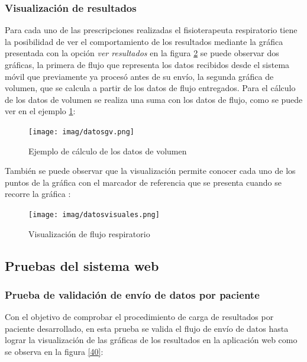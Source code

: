 \documentclass[12pt]{article}
\begin{document}
\subsubsection{Visualización de resultados}

Para cada uno de las prescripciones realizadas el fisioterapeuta respiratorio tiene la posibilidad de ver el comportamiento de los resultados mediante la gráfica presentada con la opción \textit{ver resultados} en la figura \ref{39} se puede observar dos gráficas, la primera de flujo que representa los datos recibidos desde el sistema móvil que previamente ya procesó antes de su envío, la segunda gráfica de volumen, que se calcula a partir de los datos de flujo entregados. Para el cálculo de los datos de volumen se realiza una suma con los datos de flujo, como se puede ver en el ejemplo \ref{vol}:

\begin{figure}[ht]
\centering
\texttt{[image: imag/datosgv.png]}
\caption{Ejemplo de cálculo de los datos de volumen}
\label{vol}
\end{figure}
\FloatBarrier




También se puede observar que la visualización permite conocer cada uno de los puntos de la gráfica con el marcador de referencia que se presenta cuando se recorre la gráfica :

\begin{figure}[ht]
\centering
\texttt{[image: imag/datosvisuales.png]}
\caption{Visualización de flujo respiratorio}
\label{39}
\end{figure}
\FloatBarrier




 \subsection{Pruebas del sistema web}
 
\subsubsection{Prueba de validación de envío de datos por paciente }
Con el objetivo de comprobar el procedimiento de carga de resultados por paciente desarrollado, en esta prueba se valida el flujo de envío de datos hasta lograr la visualización de las gráficas de los resultados en la aplicación web como se observa en la figura \ref{40}:
\end{document}
